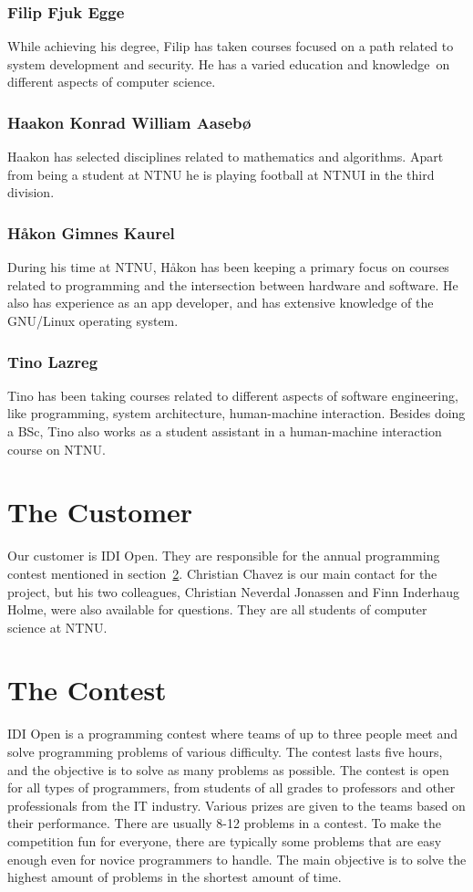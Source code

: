 \subsubsection{Filip Fjuk Egge}
While achieving his degree, Filip has taken courses focused on a path
related to system development and security. He has a varied education
and knowledge\ on different aspects of computer science. 

\subsubsection{Haakon Konrad William Aasebø}
Haakon has selected disciplines related to mathematics and algorithms.
Apart from being a student at NTNU he is playing football at NTNUI in
the third division. 

\subsubsection{Håkon Gimnes Kaurel}
During his time at NTNU, Håkon has been keeping a primary focus on
courses related to programming and the intersection between hardware and
software. He also has experience as an app developer, and has extensive
knowledge of the GNU/Linux operating system. 

\subsubsection{Tino Lazreg}
Tino has been taking courses related to different aspects of software
engineering, like programming, system architecture, human-machine
interaction. Besides doing a BSc, Tino also works as a student
assistant in a human-machine interaction course on NTNU. 

\section{The Customer}
Our customer is IDI Open. They are responsible for the annual
programming contest mentioned in section~\ref{section:contest}. Christian
Chavez is our main contact for the project, but his two colleagues, Christian
Neverdal Jonassen and Finn Inderhaug Holme, were also available for questions.
They are all students of computer science at NTNU. 

\section{The Contest}\label{section:contest}
IDI Open is a programming contest where teams of up to three people meet and
solve programming problems of various difficulty. The contest lasts five hours,
and the objective is to solve as many problems as possible. The contest is
open for all types of programmers, from students of all grades to professors
and other professionals from the IT industry. Various prizes are given to the
teams based on their performance. There are usually 8-12 problems in a contest.
To make the competition fun for everyone, there are typically some problems
that are easy enough even for novice programmers to handle. The main objective
is to solve the highest amount of problems in the shortest amount of time.

